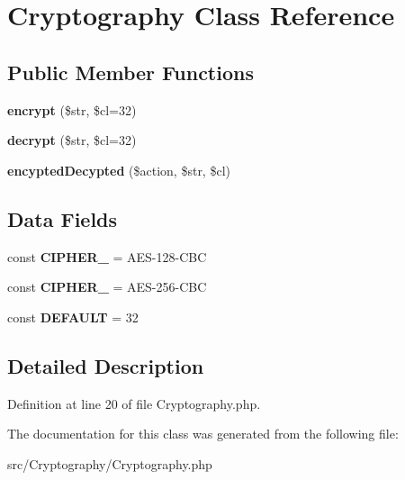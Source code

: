 \hypertarget{class_zest_1_1_cryptography_1_1_cryptography}{}\section{Cryptography Class Reference}
\label{class_zest_1_1_cryptography_1_1_cryptography}
\subsection*{Public Member Functions}
\begin{DoxyCompactItemize}
\item 
\mbox{\label{class_zest_1_1_cryptography_1_1_cryptography_a49443d38a2eb93b93a639b5410a34b98}} 
{\bfseries encrypt} (\$str, \$cl=32)
\item 
\mbox{\label{class_zest_1_1_cryptography_1_1_cryptography_afd11fee56755fef63a0ca09c780e34ce}} 
{\bfseries decrypt} (\$str, \$cl=32)
\item 
\mbox{\label{class_zest_1_1_cryptography_1_1_cryptography_ad27ac7e3de4630a8790f6ea5acb70729}} 
{\bfseries encypted\+Decypted} (\$action, \$str, \$cl)
\end{DoxyCompactItemize}
\subsection*{Data Fields}
\begin{DoxyCompactItemize}
\item 
\mbox{\label{class_zest_1_1_cryptography_1_1_cryptography_a47829120e17569debec2a34231e82979}} 
const {\bfseries C\+I\+P\+H\+E\+R\+\_} = \textquotesingle{}A\+ES-\/128-\/C\+BC\textquotesingle{}
\item 
\mbox{\label{class_zest_1_1_cryptography_1_1_cryptography_a58c6d51ff4cf630eef9cbd92e68cc6bf}} 
const {\bfseries C\+I\+P\+H\+E\+R\+\_} = \textquotesingle{}A\+ES-\/256-\/C\+BC\textquotesingle{}
\item 
\mbox{\label{class_zest_1_1_cryptography_1_1_cryptography_af3ce65309508e2623864deb6996aa88d}} 
const {\bfseries D\+E\+F\+A\+U\+LT} = 32
\end{DoxyCompactItemize}


\subsection{Detailed Description}


Definition at line 20 of file Cryptography.\+php.



The documentation for this class was generated from the following file\+:\begin{DoxyCompactItemize}
\item 
src/\+Cryptography/Cryptography.\+php\end{DoxyCompactItemize}
